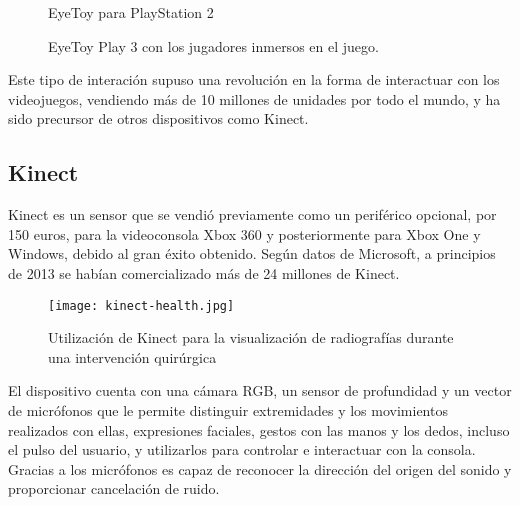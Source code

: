 \begin{figure}[h] %
\hfill
\begin{minipage}[t]{.45\textwidth}
\begin{center}
\caption{EyeToy para PlayStation 2}
\label{eyeToy}
\end{center}
\end{minipage}
\hfill
\begin{minipage}[t]{.45\textwidth}
\begin{center}
\caption{EyeToy Play 3 con los jugadores inmersos en el juego.}
\label{eyetoy-game}
\end{center}
\end{minipage}
\hfill
\end{figure}

Este tipo de interación supuso una revolución en la forma de interactuar con los videojuegos, vendiendo más de 10 millones de unidades por todo el mundo, y ha sido precursor de otros dispositivos como Kinect.

\subsection{Kinect}
Kinect es un sensor que se vendió previamente como un periférico opcional, por 150 euros, para la videoconsola Xbox 360 y posteriormente para Xbox One y Windows, debido al gran éxito obtenido. Según datos de Microsoft, a principios de 2013 se habían comercializado más de 24 millones de Kinect. 

\begin{figure}[h!]
  \centering
  \texttt{[image: kinect-health.jpg]}
  \caption{Utilización de Kinect para la visualización de radiografías durante una intervención quirúrgica}
  \label{fig:kinect-health}
\end{figure}



El dispositivo cuenta con una cámara RGB, un sensor de profundidad y un vector de micrófonos que le permite distinguir extremidades y los movimientos realizados con ellas, expresiones faciales, gestos con las manos y los dedos, incluso el pulso del usuario, y utilizarlos para controlar e interactuar con la consola. Gracias a los micrófonos es capaz de reconocer la dirección del origen del sonido y proporcionar cancelación de ruido.


